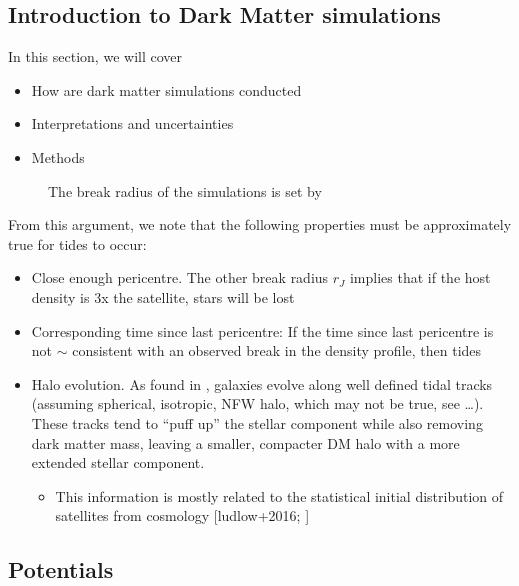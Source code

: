 \subsection{Introduction to Dark Matter
simulations}\label{introduction-to-dark-matter-simulations}

In this section, we will cover

\begin{itemize}
\tightlist
\item
  How are dark matter simulations conducted
\item
  Interpretations and uncertainties
\item
  Methods
\end{itemize}

\begin{figure}
\centering
{}
\caption[Break radius validation]{The break radius of the simulations is
set by}\label{fig:idealized_break_radius}
\end{figure}

From this argument, we note that the following properties must be
approximately true for tides to occur:

\begin{itemize}
\tightlist
\item
  Close enough pericentre. The other break radius \(r_J\) implies that
  if the host density is 3x the satellite, stars will be lost
\item
  Corresponding time since last pericentre: If the time since last
  pericentre is not \(\sim\) consistent with an observed break in the
  density profile, then tides
\item
  Halo evolution. As found in \citet{EN2021}, galaxies evolve along well
  defined tidal tracks (assuming spherical, isotropic, NFW halo, which
  may not be true, see \ldots). These tracks tend to ``puff up'' the
  stellar component while also removing dark matter mass, leaving a
  smaller, compacter DM halo with a more extended stellar component.

  \begin{itemize}
  \tightlist
  \item
    This information is mostly related to the statistical initial
    distribution of satellites from cosmology {[}ludlow+2016;
    \citet{fattahi+2018}{]}
  \end{itemize}
\end{itemize}

\subsection{Potentials}\label{potentials}

